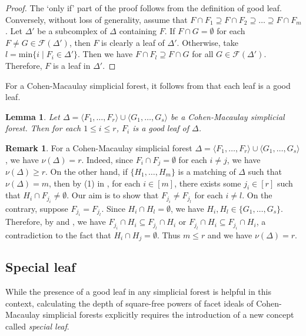 \documentclass[12pt,a4paper,reqno]{amsart}
\newtheorem{lemma}[proposition]{Lemma}
\theoremstyle{definition}
\newtheorem{remark}[proposition]{Remark}
\def\D{\Delta}
\def\F{\mathcal{F}}
\def\l{\langle}
\def\r{\rangle}
\begin{document}
\begin{proof}
    The `only if' part of the proof follows from the definition of good leaf. Conversely, without loss of generality, assume that $F\cap F_{1}\supseteq F\cap F_{2}\supseteq\dots\supseteq F\cap F_{m}$. Let $\D'$ be a subcomplex of $\Delta$ containing $F$. If $F\cap G=\emptyset$ for each $F\neq G\in\F(\D')$, then $F$ is clearly a leaf of $\D'$. Otherwise, take $l=\mathrm{min}\{i\mid F_i\in \D'\}$. Then we have $F\cap F_l\supseteq F\cap G$ for all $G\in \F(\D')$. Therefore, $F$ is a leaf in $\D'$.
\end{proof}

 For a Cohen-Macaulay simplicial forest, it follows from  that each leaf is a good leaf.

\begin{lemma}\cite{Faridi2005}\label{leaf chain}
    Let $\Delta=\l F_1,\ldots,F_r\r\cup\l G_1,\ldots,G_s\r$ be a Cohen-Macaulay simplicial forest. Then for each $1\leq i\leq r$, $F_i$ is a good leaf of $\Delta$.
\end{lemma}

\begin{remark}\label{rmk: matching number}
For a Cohen-Macaulay simplicial forest $\Delta=\l F_1,\ldots,F_r\r\cup\l G_1,\ldots,G_s\r$, we have $\nu(\Delta)=r$. Indeed, since $F_i\cap F_j=\emptyset$ for each $i\neq j$, we have $\nu(\Delta)\ge r$. On the other hand, if $\{H_1,\ldots,H_m\}$ is a matching of $\Delta$ such that $\nu(\Delta)=m$, then by (1) in , for each $i\in[m]$, there exists some $j_i\in[r]$ such that $H_i\cap F_{j_i}\neq \emptyset$. Our aim is to show that $F_{j_i}\neq F_{j_l}$ for each $i\neq l$. On the contrary, suppose $F_{j_i}=F_{j_l}$. Since $H_i\cap H_l=\emptyset$, we have $H_i,H_l\in\{G_1,\ldots,G_s\}$. Therefore, by  and , we have $F_{j_i}\cap H_i\subseteq F_{j_l}\cap H_i$ or $F_{j_l}\cap H_i\subseteq F_{j_i}\cap H_i$, a contradiction to the fact that $H_i\cap H_j=\emptyset$. Thus $m\le r$ and we have $\nu(\Delta)=r$.
\end{remark}

\subsection{Special leaf} While the presence of a good leaf in any simplicial forest is helpful in this context, calculating the depth of square-free powers of facet ideals of Cohen-Macaulay simplicial forests explicitly requires the introduction of a new concept called \textit{special leaf}. 
\end{document}
